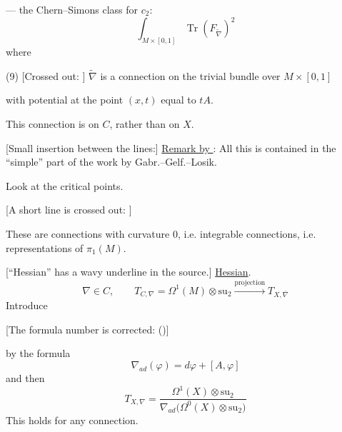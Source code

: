 --- the Chern--Simons class for $c_2$:
\begin{equation*}
\int_{M\times[0,1]}\operatorname{Tr}(F_{\widetilde\nabla})^2
\tag{8}
\end{equation*}
where

(9) [Crossed out: ]
$\widetilde\nabla$ is a connection on the trivial bundle over $M\times[0,1]$

with potential at the point $(x,t)$ equal to $tA$.

This connection is on $C$, rather than on $X$.

[Small insertion between the lines:]
\underline{Remark by }:
All this is contained in the “simple” part of the work by Gabr.--Gelf.--Losik.

Look at the critical points.

[A short line is crossed out:
]

These are connections with curvature 0, i.e. integrable connections, i.e.
representations of $\pi_1(M)$.

[“Hessian” has a wavy underline in the source.]
\underline{Hessian}.
\begin{equation*}
\nabla\in C,\qquad
T_{C,\nabla}=\Omega^1(M)\otimes\mathrm{su}_2
\overset{\text{projection}}{\longrightarrow}T_{X,\overline\nabla}
\tag{10}
\end{equation*}
Introduce

[The formula number is corrected:
()]
\begin{center}
\end{center}
by the formula
\begin{equation*}
\nabla_{ad}(\varphi)=d\varphi+[A,\varphi]
\tag{12}
\end{equation*}
and then
\begin{equation*}
T_{X,\nabla}=
\frac{\Omega^1(X)\otimes\mathrm{su}_2}
{\nabla_{ad}\bigl(\Omega^0(X)\otimes\mathrm{su}_2\bigr)}
\tag{13}
\end{equation*}
This holds for any connection.

